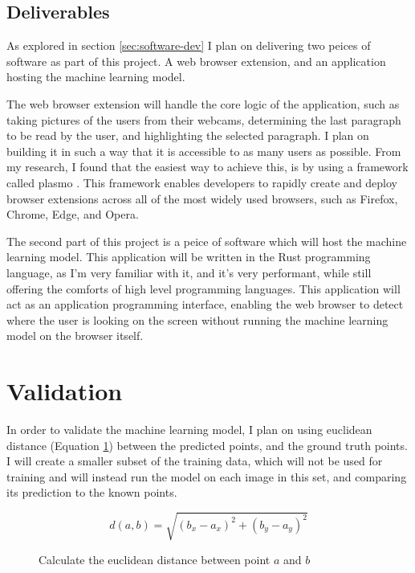 \documentclass[twocolumn]{report}
\begin{document}
\subsection{Deliverables}

As explored in section \ref{sec:software-dev} I plan on delivering two peices of software as part of this project. A web browser extension, and an application hosting the machine learning model. 

The web browser extension will handle the core logic of the application, such as taking pictures of the users from their webcams, determining the last paragraph to be read by the user, and highlighting the selected paragraph. I plan on building it in such a way that it is accessible to as many users as possible. From my research, I found that the easiest way to achieve this, is by using a framework called plasmo \cite{plasmo}. This framework enables developers to rapidly create and deploy browser extensions across all of the most widely used browsers, such as Firefox, Chrome, Edge, and Opera.  

The second part of this project is a peice of software which will host the machine learning model. This application will be written in the Rust programming language, as I'm very familiar with it, and it's very performant, while still offering the comforts of high level programming languages. This application will act as an application programming interface, enabling the web browser to detect where the user is looking on the screen without running the machine learning model on the browser itself. 


\section{Validation}

In order to validate the machine learning model, I plan on using euclidean distance (Equation \ref{eq:euclidean-distance}) between the predicted points, and the ground truth points. I will create a smaller subset of the training data, which will not be used for training and will instead run the model on each image in this set, and comparing its prediction to the known points. 

\begin{figure}
    \begin{equation}
        d(a, b) = \sqrt{(b_x - a_x)^2 + (b_y - a_y)^2}
    \end{equation}
    \label{eq:euclidean-distance}
    \caption{Calculate the euclidean distance between point $a$ and $b$}
\end{figure}
\end{document}
